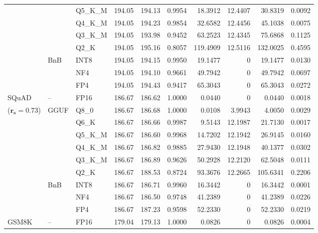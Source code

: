 \begin{longtable}{ll l rrrrrrr}
 &  & Q5\_K\_M & 194.05 & 194.13 & 0.9954 & 18.3912 & 12.4407 & 30.8319 & 0.0092 \\
 &  & Q4\_K\_M & 194.05 & 194.23 & 0.9854 & 32.6582 & 12.4456 & 45.1038 & 0.0075 \\
 &  & Q3\_K\_M & 194.05 & 193.98 & \cellcolor{red!18} 0.9452 & \cellcolor{red!18} 63.2523 & 12.4345 & \cellcolor{red!18} 75.6868 & \cellcolor{red!18} 0.1125 \\
 &  & Q2\_K & 194.05 & 195.16 & \cellcolor{red!18} 0.8057 & \cellcolor{red!18} 119.4909 & 12.5116 & \cellcolor{red!18} 132.0025 & \cellcolor{red!18} 0.4595 \\
 & BnB & INT8 & 194.05 & 194.15 & 0.9950 & 19.1477 & \cellcolor{cyan!12} $0$ & 19.1477 & 0.0130 \\
 &  & NF4 & 194.05 & 194.10 & 0.9661 & 49.7942 & \cellcolor{cyan!12} $0$ & 49.7942 & 0.0697 \\
 &  & FP4 & 194.05 & 194.43 & \cellcolor{red!18} 0.9417 & \cellcolor{red!18} 65.3043 & \cellcolor{cyan!12} $0$ & \cellcolor{red!18} 65.3043 & \cellcolor{red!18} 0.0272 \\
\midrule
SQuAD & -- & FP16 & 186.67 & 186.62 & 1.0000 & 0.0440 & \cellcolor{cyan!12} $0$ & 0.0440 & 0.0018 \\
{\small ($\mathbf{r_s{=}0.73}$)} & GGUF & Q8\_0 & 186.67 & 186.68 & 1.0000 & 0.0108 & 3.9943 & 4.0050 & 0.0029 \\
 &  & Q6\_K & 186.67 & 186.66 & 0.9987 & 9.5143 & 12.1987 & 21.7130 & 0.0017 \\
 &  & Q5\_K\_M & 186.67 & 186.60 & 0.9968 & 14.7202 & 12.1942 & 26.9145 & 0.0160 \\
 &  & Q4\_K\_M & 186.67 & 186.82 & 0.9885 & 27.9430 & 12.1948 & 40.1377 & 0.0302 \\
 &  & Q3\_K\_M & 186.67 & 186.89 & 0.9626 & 50.2928 & 12.2120 & 62.5048 & 0.0111 \\
 &  & Q2\_K & 186.67 & 188.53 & \cellcolor{red!18} 0.8724 & \cellcolor{red!18} 93.3676 & 12.2665 & \cellcolor{red!18} 105.6341 & \cellcolor{red!18} 0.2206 \\
 & BnB & INT8 & 186.67 & 186.71 & 0.9960 & 16.3442 & \cellcolor{cyan!12} $0$ & 16.3442 & 0.0001 \\
 &  & NF4 & 186.67 & 186.50 & 0.9748 & 41.2389 & \cellcolor{cyan!12} $0$ & 41.2389 & 0.0226 \\
 &  & FP4 & 186.67 & 187.23 & 0.9598 & 52.2330 & \cellcolor{cyan!12} $0$ & 52.2330 & 0.0219 \\
\midrule
GSM8K & -- & FP16 & 179.04 & 179.13 & 1.0000 & 0.0826 & \cellcolor{cyan!12} $0$ & 0.0826 & 0.0004 \\

\end{longtable}

